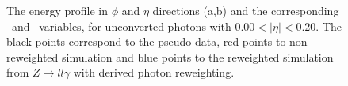 \begin{figure}[htbp]
	\begin{tcolorbox}[colback=black!5!white,colframe=white!75!black]
    \caption{The energy profile in $\phi$ and $\eta$ directions (a,b) and the corresponding \Rphi \ and \Reta \ variables, for unconverted photons with 0.00$<|\eta|<$0.20. The black points correspond to the pseudo data, red points to non-reweighted simulation and blue points to the reweighted simulation from $Z\rightarrow ll\gamma$ with derived photon reweighting.}
    \label{Photon:1}
    \end{tcolorbox}
    
\end{figure}
\begin{figure}[htbp]
    \centering
	 \\

\end{figure}
